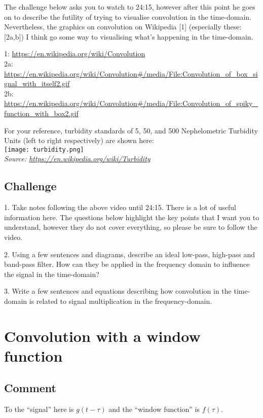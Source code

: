 The challenge below asks you to watch to 24:15, however after this point he goes on to describe the futility of trying to visualise convolution in the time-domain. Nevertheless, the graphics on convolution on Wikipedia [1] (especially these: [2a,b]) I think go some way to visualising what's happening in the time-domain.

1: \url{https://en.wikipedia.org/wiki/Convolution}\\
2a: \url{https://en.wikipedia.org/wiki/Convolution\#/media/File:Convolution_of_box_signal_with_itself2.gif}\\
2b: \url{https://en.wikipedia.org/wiki/Convolution\#/media/File:Convolution_of_spiky_function_with_box2.gif}

For your reference, turbidity standards of 5, 50, and 500 Nephelometric Turbidity Units (left to right respectively) are shown here:\\
\texttt{[image: turbidity.png]}\\
\emph{Source: \url{https://en.wikipedia.org/wiki/Turbidity}}

\subsection*{Challenge}
1. Take notes following the above video until 24:15. There is a lot of useful information here. The questions below highlight the key points that I want you to understand, however they do not cover everything, so please be sure to follow the video.

2. Using a few sentences and diagrams, describe an ideal low-pass, high-pass and band-pass filter. How can they be applied in the frequency domain to influence the signal in the time-domain?

3. Write a few sentences and equations describing how convolution in the time-domain is related to signal multiplication in the frequency-domain.

\timebox


\iffalse
\newpage
\section{Convolution with a window function}

\subsection*{Comment}
To the ``signal'' here is $g(t-\tau)$ and the ``window function'' is $f(\tau)$.

